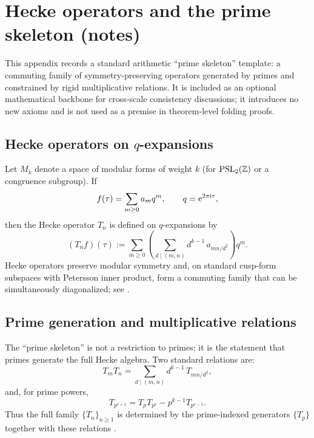 \section{Hecke operators and the prime skeleton (notes)}
\label{app:hecke_prime_skeleton}

\AuditTag This appendix records a standard arithmetic ``prime skeleton'' template: a commuting family of symmetry-preserving operators generated by primes and constrained by rigid multiplicative relations.
It is included as an optional mathematical backbone for cross-scale consistency discussions; it introduces no new axioms and is not used as a premise in theorem-level folding proofs.

\subsection{Hecke operators on \texorpdfstring{$q$}{q}-expansions}
\label{subsec:hecke_qexp}

Let $M_k$ denote a space of modular forms of weight $k$ (for $\mathrm{PSL}_2(\mathbb{Z})$ or a congruence subgroup).
If
\[
f(\tau)=\sum_{m\ge 0} a_m q^m,\qquad q=\mathrm{e}^{2\pi\mathrm{i}\tau},
\]
then the Hecke operator $T_n$ is defined on $q$-expansions by
\begin{equation}
\label{eq:hecke_qexp_action_z128}
(T_n f)(\tau)
:=\sum_{m\ge 0}\left(\sum_{d\mid (m,n)} d^{k-1}\, a_{mn/d^2}\right) q^m.
\end{equation}
Hecke operators preserve modular symmetry and, on standard cusp-form subspaces with Petersson inner product, form a commuting family that can be simultaneously diagonalized; see \cite{Apostol1990,DiamondShurman2005}.

\subsection{Prime generation and multiplicative relations}
\label{subsec:hecke_prime_generation}

The ``prime skeleton'' is not a restriction to primes; it is the statement that primes generate the full Hecke algebra.
Two standard relations are:
\begin{equation}
\label{eq:hecke_multiplication_z128}
T_m T_n = \sum_{d\mid (m,n)} d^{k-1}\, T_{mn/d^2},
\end{equation}
and, for prime powers,
\begin{equation}
\label{eq:hecke_prime_power_z128}
T_{p^{r+1}} = T_p T_{p^r} - p^{k-1} T_{p^{r-1}}.
\end{equation}
Thus the full family $\{T_n\}_{n\ge 1}$ is determined by the prime-indexed generators $\{T_p\}$ together with these relations \cite{Apostol1990,DiamondShurman2005}.

